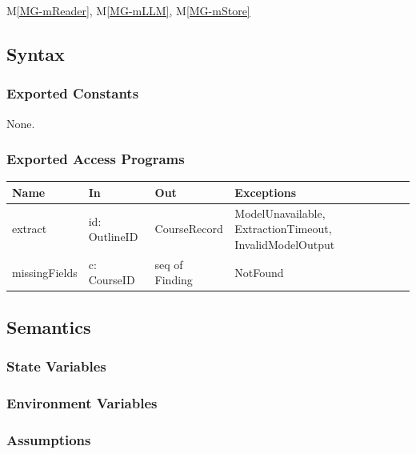 \documentclass[12pt, titlepage]{article}
\newcommand{\mref}[1]{M\ref{MG-#1}}
\begin{document}
\mref{mReader}, \mref{mLLM}, \mref{mStore}

\subsection{Syntax}

\subsubsection{Exported Constants}

None.


\subsubsection{Exported Access Programs}

\begin{center}\small
\begin{tabular}{>{\raggedright\arraybackslash}p{3.3cm} >{\raggedright\arraybackslash}p{4.1cm} >{\raggedright\arraybackslash}p{3.4cm} >{\raggedright\arraybackslash}p{4.0cm}}
\hline
\textbf{Name} & \textbf{In} & \textbf{Out} & \textbf{Exceptions} \\
\hline
extract & id: OutlineID & CourseRecord & ModelUnavailable, ExtractionTimeout, InvalidModelOutput \\
missingFields & c: CourseID & seq of Finding & NotFound \\
\hline
\end{tabular}
\end{center}

\subsection{Semantics}

\subsubsection{State Variables}


\subsubsection{Environment Variables}


\subsubsection{Assumptions}
\end{document}
